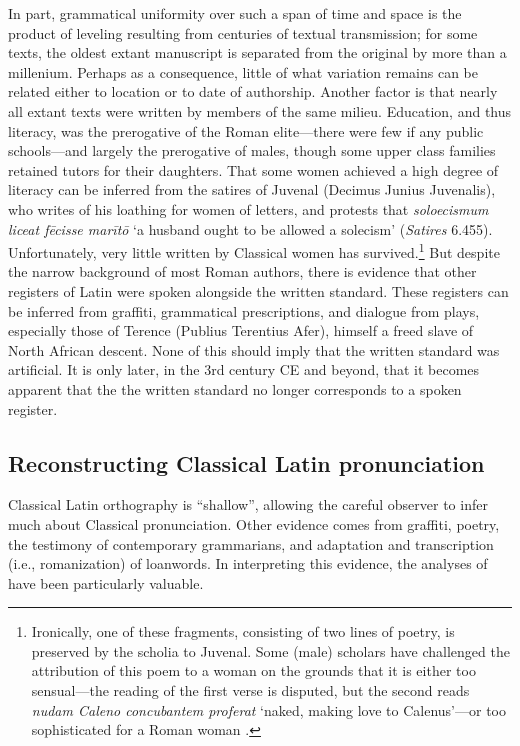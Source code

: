 In part, grammatical uniformity over such a span of time and space is the product of leveling resulting from centuries of textual transmission;
for some texts, the oldest extant manuscript is separated from the original by more than a millenium.
Perhaps as a consequence, little of what variation remains can be related either to location or to date of authorship.
Another factor is that nearly all extant texts were written by members of the same milieu.
Education, and thus literacy, was the prerogative of the Roman elite---there were few if any public schools---and largely the prerogative of males, though some upper class families retained tutors for their daughters.
That some women achieved a high degree of literacy can be inferred from the satires of Juvenal (Decimus Junius Juvenalis), who writes of his loathing for women of letters, and protests that \emph{soloecismum liceat fēcisse marītō} `a husband ought to be allowed a solecism' (\emph{Satires} 6.455).
Unfortunately, very little written by Classical women has survived.\footnote{
    Ironically, one of these fragments, consisting of two lines of poetry, is preserved by the scholia to Juvenal.
    Some (male) scholars have challenged the attribution of this poem to a woman on the grounds that it is either too sensual---the reading of the first verse is disputed, but the second reads \emph{nudam Caleno concubantem proferat} `naked, making love to Calenus'---or too sophisticated for a Roman woman \citep[see][]{Keith2006}.}
But despite the narrow background of most Roman authors, there is evidence that other registers of Latin were spoken alongside the written standard.
These registers can be inferred from graffiti, grammatical prescriptions, and dialogue from plays, especially those of Terence (Publius Terentius Afer), himself a freed slave of North African descent.
None of this should imply that the written standard was artificial. 
It is only later, in the 3rd century CE and beyond, that it becomes apparent that the the written standard no longer corresponds to a spoken register.

\subsection{Reconstructing Classical Latin pronunciation}

Classical Latin orthography is ``shallow'', allowing the careful observer to infer much about Classical pronunciation.
Other evidence comes from graffiti, poetry, the testimony of contemporary grammarians, and adaptation and transcription (i.e., romanization) of loanwords.
In interpreting this evidence, the analyses of \citealt{Allen1978} have been particularly valuable.

